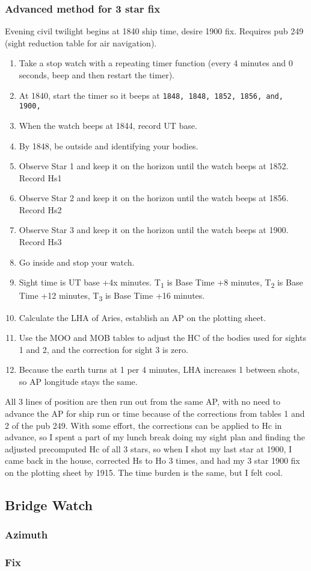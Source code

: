 \documentclass[letterpaper,12pt]{article}
\begin{document}
\subsubsection*{Advanced method for 3 star fix}
Evening civil twilight begins at 1840 ship time, desire 1900 fix.
Requires pub 249 (sight reduction table for air navigation). 
\begin{enumerate} \item Take a stop watch with a repeating timer function (every 4 minutes and 0 seconds, beep and then restart the timer).
\item At 1840, start the timer so it beeps at \texttt{1848, 1848, 1852, 1856, and, 1900,}
\item When the watch beeps at 1844, record UT base.
\item By 1848, be outside and identifying your bodies.
\item Observe Star 1 and keep it on the horizon until the watch beeps at 1852. Record Hs1
\item Observe Star 2 and keep it on the horizon until the watch beeps at 1856. Record Hs2
\item Observe Star 3 and keep it on the horizon until the watch beeps at 1900. Record Hs3
\item Go inside and stop your watch.
\item Sight time is UT base +4x minutes. T\textsubscript{1} is Base Time +8 minutes, T\textsubscript{2} is Base Time +12 minutes, T\textsubscript{3} is Base Time +16 minutes.
\item Calculate the LHA of Aries, establish an AP on the plotting sheet.
\item Use the MOO and MOB tables to adjust the HC of the bodies used for sights 1 and 2, and the correction for sight 3 is zero.
\item Because the earth turns at 1\textdegree{} per 4 minutes, LHA\aries{} increases 1\textdegree{} between shots, so AP longitude stays the same.
\end{enumerate}
All 3 lines of position are then run out from the same AP, with no need to advance the AP for ship run or time because of the corrections from tables 1 and 2 of the pub 249.
With some effort, the corrections can be applied to Hc in advance, so I spent a part of my lunch break doing my sight plan and finding the adjusted precomputed Hc of all 3 stars, so when I shot my last star at 1900, I came back in the house, corrected Hs to Ho 3 times, and had my 3 star 1900 fix on the plotting sheet by 1915.
The time burden is the same, but I felt cool.

\subsection{Bridge Watch}
\subsubsection{Azimuth} \label{doubleget}
\subsubsection{Fix}
\clearpage
\printbibliography
\end{document}
